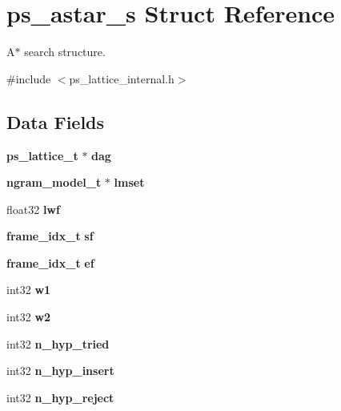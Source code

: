\section{ps\-\_\-astar\-\_\-s Struct Reference}
\label{structps__astar__s}


A$\ast$ search structure.  




{\ttfamily \#include $<$ps\-\_\-lattice\-\_\-internal.\-h$>$}

\subsection*{Data Fields}
\begin{DoxyCompactItemize}
\item 
{\bf ps\-\_\-lattice\-\_\-t} $\ast$ {\bfseries dag}\label{structps__astar__s_a3c6c2135760c306452e7f5b995091576}

\item 
{\bf ngram\-\_\-model\-\_\-t} $\ast$ {\bfseries lmset}\label{structps__astar__s_a5b7f214f56369c27753e66046fc8ef5c}

\item 
float32 {\bfseries lwf}\label{structps__astar__s_a9b1624982f8e671404581ac8b372a445}

\item 
{\bf frame\-\_\-idx\-\_\-t} {\bfseries sf}\label{structps__astar__s_a89a18074075a7793803b242bbe8a3028}

\item 
{\bf frame\-\_\-idx\-\_\-t} {\bfseries ef}\label{structps__astar__s_aa2104e1a0a3b369582b5fa920ffa51e6}

\item 
int32 {\bfseries w1}\label{structps__astar__s_ad1ada6d9fe189e9f7c028ade731967b2}

\item 
int32 {\bfseries w2}\label{structps__astar__s_aa3fcb0733516a2740086969c4b4c88e4}

\item 
int32 {\bfseries n\-\_\-hyp\-\_\-tried}\label{structps__astar__s_ad8eb709a4df4d04112578b3cb390e1c5}

\item 
int32 {\bfseries n\-\_\-hyp\-\_\-insert}\label{structps__astar__s_abd46619036fe6ff13ca9d2ca5b76512b}

\item 
int32 {\bfseries n\-\_\-hyp\-\_\-reject}\label{structps__astar__s_a3de51b20d960b50aec4d908af5e43787}


\end{DoxyCompactItemize}
